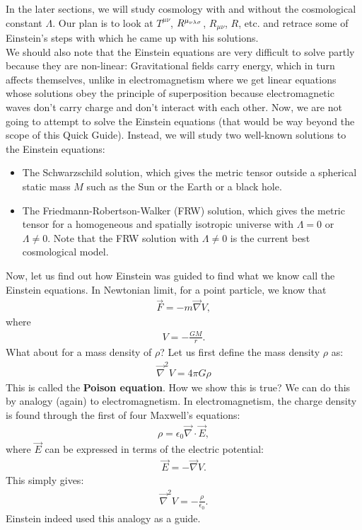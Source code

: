 \documentclass{article}
\theoremstyle{definition}
\begin{document}
In the later sections, we will study cosmology with and without the cosmological constant $\Lambda$. Our plan is to look at $T^{\mu\nu}$, $\tensor{R}{^{\mu_{\nu\lambda\sigma}}}$, $R_{\mu\nu}$, $R$, etc. and retrace some of Einstein's steps with which he came up with his solutions. \\

We should also note that the Einstein equations are very difficult to solve partly because they are non-linear: Gravitational fields carry energy, which in turn affects themselves, unlike in electromagnetism where we get linear equations whose solutions obey the principle of superposition because electromagnetic waves don't carry charge and don't interact with each other. Now, we are not going to attempt to solve the Einstein equations (that would be way beyond the scope of this Quick Guide). Instead, we will study two well-known solutions to the Einstein equations:
\begin{itemize}
	\item The Schwarzschild solution, which gives the metric tensor outside a spherical static mass $M$ such as the Sun or the Earth or a black hole. 
	\item The Friedmann-Robertson-Walker (FRW) solution, which gives the metric tensor for a homogeneous and spatially isotropic universe with $\Lambda = 0$ or $\Lambda \neq 0$. Note that the FRW solution with $\Lambda \neq 0$ is the current best cosmological model.  
\end{itemize}

Now, let us find out how Einstein was guided to find what we know call the Einstein equations. In Newtonian limit, for a point particle, we know that
\begin{align*}
\vec{F} = -m\vec{\nabla}V, 
\end{align*}
where 
\begin{align*}
V = -\frac{GM}{r}.
\end{align*}
What about for a mass density of $\rho$? Let us first define the mass density $\rho$ as:
\begin{align*}
\boxed{\vec{\nabla}^2V = 4\pi G \rho}
\end{align*}
This is called the \textbf{Poison equation}. How we show this is true? We can do this by analogy (again) to electromagnetism. In electromagnetism, the charge density is found through the first of four Maxwell's equations:
\begin{align*}
\rho = \epsilon_0\vec{\nabla}\cdot\vec{E},
\end{align*}
where $\vec{E}$ can be expressed in terms of the electric potential:
\begin{align*}
\vec{E} = -\vec{\nabla}V.
\end{align*}
This simply gives:
\begin{align*}
\vec{\nabla}^2V = -\frac{\rho}{\epsilon_0}.
\end{align*}
Einstein indeed used this analogy as a guide. 
\end{document}
